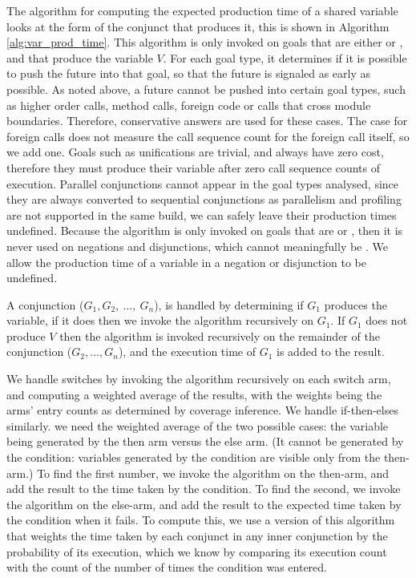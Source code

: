 The algorithm for computing the expected production time
of a shared variable looks at the form of the conjunct that produces it,
this is shown in Algorithm \ref{alg:var_prod_time}.
This algorithm is only invoked on goals that are either \ddet or \dccmulti,
and that produce the variable $V$.
For each goal type,
it determines if it is possible to push the future into that goal,
so that the future is signaled as early as possible.
As noted above,
a future cannot be pushed into certain goal types,
such as higher order calls, method calls,
foreign code or calls that cross module boundaries.
Therefore,
conservative answers are used for these cases.
The case for foreign calls does not measure the call sequence count for the
foreign call itself, so we add one.
Goals such as unifications are trivial, and always have zero cost,
therefore they must produce their variable after zero call sequence counts
of execution.
Parallel conjunctions cannot appear in the goal types analysed,
since they are always converted to sequential conjunctions as parallelism and
profiling are not supported in the same build,
we can safely leave their production times undefined.
Because the algorithm is only invoked on goals that are \ddet or \dccmulti,
then it is never used on negations and disjunctions,
which cannot meaningfully be \ddet.
We allow the production time of a variable in a negation or disjunction to
be undefined.

A conjunction 
($G_1,G_2,~\ldots,~G_n$),
is handled by determining if $G_1$ produces the variable,
if it does then we invoke the algorithm recursively on $G_1$.
If $G_1$ does not produce $V$ then the algorithm is invoked recursively on
the remainder of the conjunction ($G_2,\ldots,G_n$),
and the execution time of $G_1$ is added to the result.

We handle switches by invoking the algorithm recursively on each switch
arm,
and computing a weighted average of the results,
with the weights being the arms' entry counts as determined by coverage
inference.
We handle if-then-elses similarly.
we need the weighted average of the two possible cases:
the variable being generated by the then arm versus the else arm.
(It cannot be generated by the condition:
variables generated by the condition are visible only from the then-arm.)
To find the first number,
we invoke the algorithm on the then-arm,
and add the result to the time taken by the condition.
To find the second,
we invoke the algorithm on the else-arm,
and add the result to the expected time taken by the condition when it fails.
To compute this, we use a version of this algorithm
that weights the time taken by each conjunct in any inner conjunction
by the probability of its execution,
which we know by comparing its execution count
with the count of the number of times the condition was entered.

